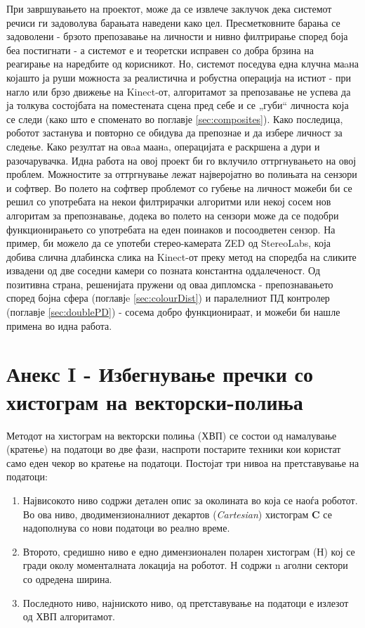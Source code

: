 \documentclass[11pt]{article}
\begin{document}
  При завршувањето на проектот, може да се извлече заклучок дека системот речиси ги задоволува барањата наведени како цел. Пресметковните барања се задоволени - брзото препозавање на личности и нивно филтрирање според боја беа постигнати - а системот е и теоретски исправен со добра брзина на реагирање на наредбите од корисникот. Но, системот поседува една клучна маaна којашто ја руши можноста за реалистична и робустна операција на истиот - при нагло или брзо движење на Kinect-от, алгоритамот за препозавање не успева да ја толкува состојбата на поместената сцена пред себе и се „губи“ личноста која се следи (како што е споменато во поглавје \ref{sec:composites}). Како последица, роботот застанува и повторно се обидува да препознае и да избере личност за следење.
  \bigbreak
  Како резултат на овaа маанa, операцијата е раскршена а дури и разочарувачка. Идна работа на овој проект би го вклучило оттргнувањето на овој проблем. Можностите за оттргнување лежат најверојатно во полињата на сензори и софтвер. Во полето на софтвер проблемот со губење на личност можеби би се решил со употребата на некои филтрирачки алгоритми или некој сосем нов алгоритам за препознавање, додека во полето на сензори може да се подобри функционирањето со употребата на еден поинаков и посоодветен сензор. На пример, би можело да се употеби стерео-камерата ZED од StereoLabs, која добива слична длабинска слика на Kinect-от преку метод на споредба на сликите извадени од две соседни камери со позната константна оддалеченост.
  \bigbreak
  Од позитивна страна, решенијата пружени од оваа дипломска - препознавањето според бојна сфера (поглавјe \ref{sec:colourDist}) и паралелниот ПД контролер (поглавје \ref{sec:doublePD}) - сосема добро функционираат, и можеби би нашле примена во идна работа.

\newpage

\section*{Анекс I - Избегнување пречки со хистограм на векторски-полиња}
  \label{sec:vfh}
  Методот на хистограм на векторски полиња (ХВП) се состои од намалување (кратење) на податоци во две фази, наспроти постарите техники кои користат само еден чекор во кратење на податоци. Постојат три нивоа на претставување на податоци:

  \begin{enumerate}
    \item Највисокото ниво содржи детален опис за околината во која се наоѓа роботот. Во ова ниво, дводимензионалниот декартов (\textit{Cartesian}) хистограм \textbf{C} се надополнува со нови податоци во реално време.
    \item Второто, средишно ниво е едно димензионален поларен хистограм (Н) кој се гради околу моменталната локација на роботот. Н содржи n аголни сектори со одредена ширина.
    \item Последното ниво, најниското ниво, од претставување на податоци е излезот од ХВП алгоритамот.
    \end{enumerate}
\end{document}
